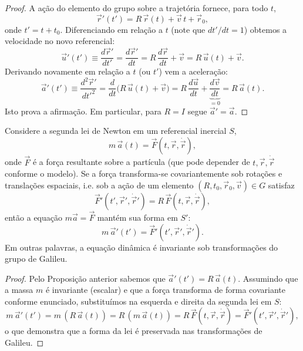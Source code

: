 \documentclass[../../main]{subfiles}
\begin{document}
\begin{proof}
    A ação do elemento do grupo sobre a trajetória fornece, para todo \(t\),
    \[
        \vec r'(t') = R\,\vec r(t) + \vec v\,t + \vec r_0,
    \]
    onde \(t'=t+t_0\). Diferenciando em relação a \(t\) (note que \(dt'/dt=1\))
    obtemos a velocidade no novo referencial:
    \[
        \vec u'(t') \equiv \frac{d\vec r'}{dt'} = \frac{d\vec r'}{dt}
        = R\,\frac{d\vec r}{dt} + \vec v = R\,\vec u(t) + \vec v.
    \]
    Derivando novamente em relação a \(t\) (ou \(t'\)) vem a aceleração:
    \[
        \vec a'(t') \equiv \frac{d^2\vec r'}{d t'^2} =
        \frac{d}{dt}\bigl(R\,\vec u(t) + \vec v\bigr)
        = R\,\frac{d\vec u}{dt} + \underbrace{\frac{d\vec v}{dt}}_{=0}
        = R\,\vec a(t).
    \]
    Isto prova a afirmação. Em particular, para \(R=I\) segue \(\vec a'=\vec
    a\).
\end{proof}

\begin{prop}[Invariância das leis de Newton (forma \(m\vec a=\vec F\)) sob o
    grupo de Galileu]
    Considere a segunda lei de Newton em um referencial inercial \(S\),
    \[
        m\,\vec a(t) = \vec F(t,\vec r,\dot{\vec r}),
    \]
    onde \(\vec F\) é a força resultante sobre a partícula (que pode depender
    de \(t,\vec r,\dot{\vec r}\) conforme o modelo). Se a força transforma-se
    covariantemente sob rotações e translações espaciais, i.e. sob a ação de um
    elemento \((R,t_0,\vec r_0,\vec v)\in G\) satisfaz
    \[
        \vec F'(t',\vec r',\dot{\vec r}') = R\,\vec F(t,\vec r,\dot{\vec r}),
    \]
    então a equação \(m\vec a=\vec F\) mantém sua forma em \(S'\):
    \[
        m\,\vec a'(t') = \vec F'(t',\vec r',\dot{\vec r}').
    \]
    Em outras palavras, a equação dinâmica é invariante sob transformações do
    grupo de Galileu.
\end{prop}

\begin{proof}
    Pelo Proposição anterior sabemos que \(\vec a'(t')=R\,\vec a(t)\).
    Assumindo que a massa \(m\) é invariante (escalar) e que a força transforma
    de forma covariante conforme enunciado, substituímos na esquerda e direita
    da segunda lei em \(S\):
    \[
        m\,\vec a'(t') = m\,(R\,\vec a(t)) = R\,(m\,\vec a(t)) = R\,\vec
        F(t,\vec r,\dot{\vec r}) = \vec F'(t',\vec r',\dot{\vec r}'),
    \]
    o que demonstra que a forma da lei é preservada nas transformações de
    Galileu.
\end{proof}
\end{document}
